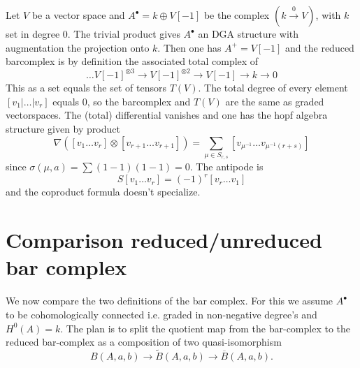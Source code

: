 \begin{exam}
Let $V$ be a vector space and $A^\bullet = k \oplus V[-1]$ be the complex $(k \stackrel{0}{\to} V)$, with $k$ set in degree $0$. 
The trivial product gives $A^\bullet$ an DGA structure with augmentation the projection onto $k$. 
Then one has $A^+ = V[-1]$ and the reduced barcomplex is by definition the associated total complex of
\[ \ldots V[-1]^{\otimes 3} \to V[-1]^{\otimes 2} \to  V[-1] \to  k \to 0\]
This as a set equals the set of tensors $T(V)$. 
The total degree of every element $[v_1 | \ldots | v_r]$ equals $0$, so the barcomplex and $T(V)$ are the same as graded vectorspaces. 
The (total) differential vanishes and one has the hopf algebra structure given by product 
\[ \nabla ([v_1 \ldots v_r] \otimes [v_{r+1} \ldots v_{r+1}]) = \sum_{\mu \in S_{r,s}} [v_{\mu^{-1}} \ldots v_{\mu^{-1}(r+s)}]
\]
since $\sigma(\mu,a) = \sum (1-1)(1-1) = 0$. The antipode is 
\[ S[v_1 \ldots v_r] = (-1)^r [v_r \ldots v_1] 
\] 
and the coproduct formula doesn't specialize. 
\end{exam}

\section{Comparison reduced/unreduced bar complex}

We now compare the two definitions of the bar complex. 
For this we assume $A^{\bullet}$ to be cohomologically connected i.e. graded in non-negative degree's and $H^0(A) = k$. 
The plan is to split the quotient map from the bar-complex to the reduced bar-complex as a composition of two quasi-isomorphism 
\[
B(A, a, b) \to \widetilde{B}(A, a, b) \to \overline{B}(A, a, b).
\]

